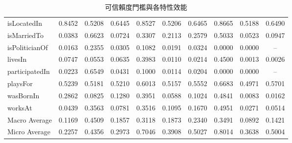 \begin{table}[htbp]
\begin{tabular}{|l|c|c|c||c|c|c||c|c|c|}
isLocatedIn & 0.8452 & 0.5208 & 0.6445 & 0.8527 & 0.5206 & 0.6465 & 0.8665 & 0.5188 & 0.6490 \\
isMarriedTo & 0.0383 & 0.6623 & 0.0724 & 0.3307 & 0.2113 & 0.2579 & 0.5033 & 0.0523 & 0.0947 \\
isPoliticianOf & 0.0163 & 0.2355 & 0.0305 & 0.1082 & 0.0191 & 0.0324 & 0.0000 & 0.0000 & -- \\
livesIn & 0.0747 & 0.0553 & 0.0635 & 0.3983 & 0.0110 & 0.0214 & 0.4500 & 0.0013 & 0.0026 \\
participatedIn & 0.0223 & 0.6549 & 0.0431 & 0.1000 & 0.0114 & 0.0204 & 0.0000 & 0.0000 & -- \\
playsFor & 0.5239 & 0.5181 & 0.5210 & 0.6013 & 0.5157 & 0.5552 & 0.6683 & 0.4971 & 0.5701 \\
wasBornIn & 0.2862 & 0.0825 & 0.1280 & 0.3951 & 0.0588 & 0.1024 & 0.4841 & 0.0083 & 0.0162 \\
worksAt & 0.0439 & 0.3563 & 0.0781 & 0.3516 & 0.1095 & 0.1670 & 0.4951 & 0.0271 & 0.0514 \\
\hline
Macro Average & 0.1169 & 0.4509 & 0.1857 & 0.3118 & 0.1873 & 0.2340 & 0.3491 & 0.0892 & 0.1421 \\
Micro Average & 0.2257 & 0.4356 & 0.2973 & 0.7046 & 0.3908 & 0.5027 & 0.8014 & 0.3638 & 0.5004 \\
\hline
\end{tabular}
\caption{可信賴度門檻與各特性效能}
\label{t:reliability}
\end{table}

